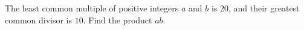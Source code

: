 The least common multiple of positive integers $a$ and $b$ is $20$, and their greatest common divisor is $10$. Find the product $ab$.
